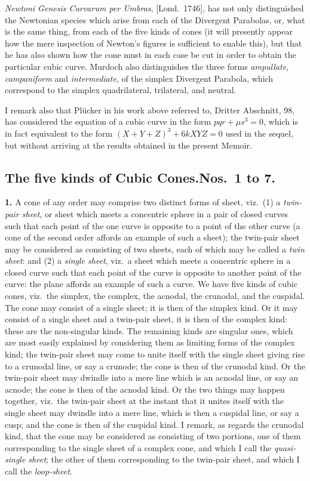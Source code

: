 \documentclass[11pt,a4paper]{article}
\begin{document}
\textit{Newtoni Genesis Curvarum per Umbras}, [Lond.\ 1746], has not only distinguished the Newtonian species which arise from each of the Divergent Parabolas, or, what is the same thing, from each of the five kinds of cones (it will presently appear how the mere inspection of Newton's figures is sufficient to enable this), but that he has also shown how the cone must in each case be cut in order to obtain the particular cubic curve. Murdoch also distinguishes the three forms \textit{ampullate}, \textit{campaniform} and \textit{intermediate}, of the simplex Divergent Parabola, which correspond to the simplex quadrilateral, trilateral, and neutral.

I remark also that Pl\"ucker in his work above referred to, Dritter Abschnitt, 98, has considered the equation of a cubic curve in the form $pqr + \mu s^{3} = 0$, which is in fact equivalent to the form $(X + Y + Z)^{3} + 6kXYZ = 0$ used in the sequel, but without arriving at the results obtained in the present Memoir.

\subsection*{The five kinds of Cubic Cones.\quad Nos.\ 1 to 7.}

\textbf{1.} A cone of any order may comprise two distinct forms of sheet, viz.\ (1) a \textit{twin-pair sheet}, or sheet which meets a concentric sphere in a pair of closed curves such that each point of the one curve is opposite to a point of the other curve (a cone of the second order affords an example of such a sheet); the twin-pair sheet may be considered as consisting of two sheets, each of which may be called a \textit{twin sheet}: and (2) a \textit{single sheet}, viz.\ a sheet which meets a concentric sphere in a closed curve such that each point of the curve is opposite to another point of the curve: the plane affords an example of such a curve. We have five kinds of cubic cones, viz.\ the simplex, the complex, the acnodal, the crunodal, and the cuspidal. The cone may consist of a single sheet; it is then of the simplex kind. Or it may consist of a single sheet and a twin-pair sheet, it is then of the complex kind: these are the non-singular kinds. The remaining kinds are singular ones, which are most easily explained by considering them as limiting forms of the complex kind; the twin-pair sheet may come to unite itself with the single sheet giving rise to a crunodal line, or say a crunode; the cone is then of the crunodal kind. Or the twin-pair sheet may dwindle into a mere line which is an acnodal line, or say an acnode; the cone is then of the acnodal kind. Or the two things may happen together, viz.\ the twin-pair sheet at the instant that it unites itself with the single sheet may dwindle into a mere line, which is then a cuspidal line, or say a cusp; and the cone is then of the cuspidal kind. I remark, as regards the crunodal kind, that the cone may be considered as consisting of two portions, one of them corresponding to the single sheet of a complex cone, and which I call the \textit{quasi-single sheet}; the other of them corresponding to the twin-pair sheet, and which I call the \textit{loop-sheet}.
\end{document}
